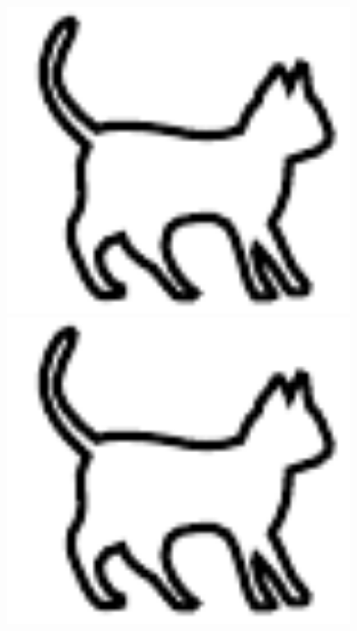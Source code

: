 \documentclass{cumcmthesis} %
\begin{document}
\begin{figure}[H]
    \begin{minipage}[t]{0.5\textwidth}
        \centering
        \includegraphics[width=0.9\textwidth]{img/cat.pdf}
    \end{minipage}
    \begin{minipage}[t]{0.5\textwidth}
        \centering
        \includegraphics[width=0.9\textwidth]{img/cat.pdf}
    \end{minipage} \\ %
    \begin{minipage}[t]{0.5\textwidth}

\end{minipage}
\end{figure}
\end{document}
